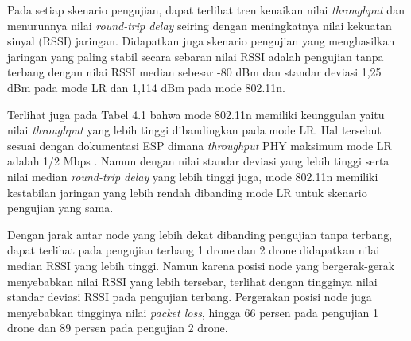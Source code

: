 Pada setiap skenario pengujian, dapat terlihat tren kenaikan nilai \textit{throughput} dan menurunnya nilai \textit{round-trip delay} seiring dengan meningkatnya nilai kekuatan sinyal (RSSI) jaringan. Didapatkan juga skenario pengujian yang menghasilkan jaringan yang paling stabil secara sebaran nilai RSSI adalah pengujian tanpa terbang dengan nilai RSSI median sebesar -80 dBm dan standar deviasi 1,25 dBm pada mode LR dan 1,114 dBm pada mode 802.11n.

Terlihat juga pada Tabel 4.1 bahwa mode 802.11n memiliki keunggulan yaitu nilai \textit{throughput} yang lebih tinggi dibandingkan pada mode LR. Hal tersebut sesuai dengan dokumentasi ESP dimana \textit{throughput} PHY maksimum mode LR adalah 1/2 Mbps \cite{WiFiDriverESP32}. Namun dengan nilai standar deviasi yang lebih tinggi serta nilai median \textit{round-trip delay} yang lebih tinggi juga, mode 802.11n memiliki kestabilan jaringan yang lebih rendah dibanding mode LR untuk skenario pengujian yang sama.

Dengan jarak antar node yang lebih dekat dibanding pengujian tanpa terbang, dapat terlihat pada pengujian terbang 1 drone dan 2 drone didapatkan nilai median RSSI yang lebih tinggi. Namun karena posisi node yang bergerak-gerak menyebabkan nilai RSSI yang lebih tersebar, terlihat dengan tingginya nilai standar deviasi RSSI pada pengujian terbang. Pergerakan posisi node juga menyebabkan tingginya nilai \textit{packet loss}, hingga 66 persen pada pengujian 1 drone dan 89 persen pada pengujian 2 drone. 
